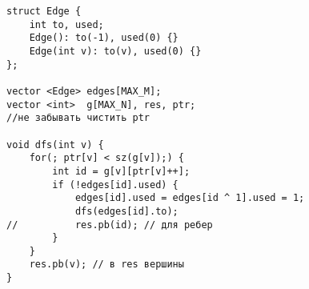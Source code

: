 \begin{verbatim}
struct Edge {
	int to, used;
	Edge(): to(-1), used(0) {}	
	Edge(int v): to(v), used(0) {}
};

vector <Edge> edges[MAX_M]; 
vector <int>  g[MAX_N], res, ptr;
//не забывать чистить ptr

void dfs(int v) {
	for(; ptr[v] < sz(g[v]);) {
		int id = g[v][ptr[v]++];
		if (!edges[id].used) {
			edges[id].used = edges[id ^ 1].used = 1;
			dfs(edges[id].to); 
//			res.pb(id); // для ребер
		}
	}
	res.pb(v); // в res вершины
}
\end{verbatim}

